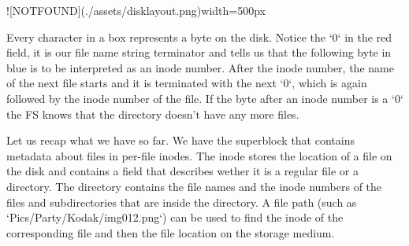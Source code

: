 ![NOTFOUND](./assets/disklayout.png){width=500px}

Every character in a box represents a byte on the disk. Notice the `0` in the red field,
it is our file name string terminator and tells us that the following byte in blue is to be interpreted
as an inode number. After the inode number, the name of the next file starts and it is terminated with the next `0`, which is again
followed by the inode number of the file. If the byte after an inode number is a `0` the FS knows
that the directory doesn't have any more files.

Let us recap what we have so far.
We have the superblock that contains metadata about files in per-file inodes. The inode stores the
location of a file on the disk and contains a field that describes wether it is a regular file or a
directory. The directory contains the file names and the inode numbers of the files and subdirectories
that are inside the directory. A file path (such as `Pics/Party/Kodak/img012.png`) can
be used to find the inode of the corresponding file and then the file location on the storage medium.


